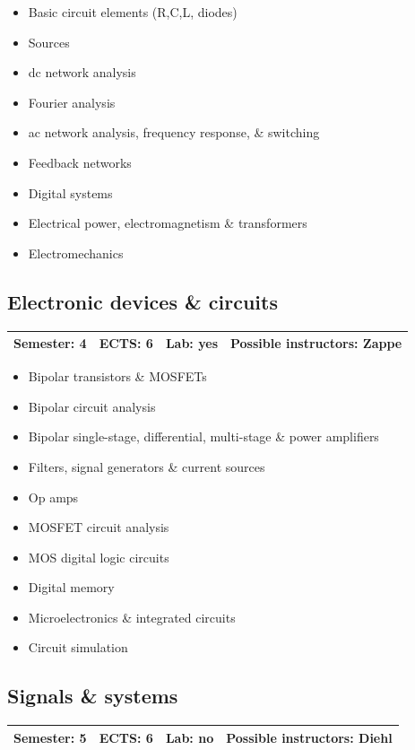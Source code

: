 \documentclass[12pt,twoside,fleqn,a4paper]{article}
\begin{document}
\begin{itemize}
\setlength\itemsep{0cm}
\item Basic circuit elements (R,C,L, diodes)
\item Sources
\item dc network analysis
\item Fourier analysis
\item ac network analysis, frequency response, \& switching
\item Feedback networks
\item Digital systems
\item Electrical power, electromagnetism \& transformers
\item Electromechanics
\end{itemize}


\subsection{Electronic devices \& circuits}
\begin{tabular}{llll} \hline
\textbf{Semester:} 4 & \textbf{ECTS:} 6 & \textbf{Lab:} yes & \textbf{Possible instructors:} Zappe\\
\hline
\end{tabular}

\begin{itemize}
\setlength\itemsep{0cm}
\item Bipolar transistors \& MOSFETs
\item Bipolar circuit analysis
\item Bipolar single-stage, differential, multi-stage \& power amplifiers
\item Filters, signal generators \& current sources
\item Op amps
\item MOSFET circuit analysis
\item MOS digital logic circuits
\item Digital memory
\item Microelectronics \& integrated circuits
\item Circuit simulation
\end{itemize}


\subsection{Signals \& systems}
\begin{tabular}{llll} \hline
\textbf{Semester:} 5 & \textbf{ECTS:} 6 & \textbf{Lab:} no & \textbf{Possible instructors:} Diehl\\
\hline
\end{tabular}
\end{document}
